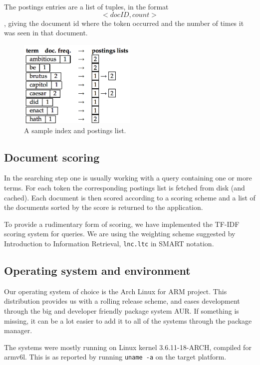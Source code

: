 The postings entries are a list of tuples, in the format $$<docID, count>$$, giving the document id where the token occurred and the number of times it was seen in that document.

\begin{figure}[h]
    \center
    \includegraphics[width=0.5\textwidth]{software/index_postings_lists}
    \caption{A sample index and postings list.\cite{IntroIR}}
    \label{fig:index_postings_lists_sw}
\end{figure}

\subsection{Document scoring}
In the searching step one is usually working with a query containing one or more terms. For each token the corresponding postings list is fetched from disk (and cached). Each document is then scored according to a scoring scheme and a list of the documents sorted by the score is returned to the application.

To provide a rudimentary form of scoring, we have implemented the TF-IDF scoring system for queries. We are using the weighting scheme suggested by Introduction to Information Retrieval\cite{IntroIR}, {\tt lnc.ltc} in SMART notation\cite{tfidfsmart}.


\subsection{Operating system and environment}
Our operating system of choice is the Arch Linux for ARM project\cite{archarm}. This distribution provides us with a rolling release scheme, and eases development through the big and developer friendly package system AUR. If something is missing, it can be a lot easier to add it to all of the systems through the package manager.

The systems were mostly running on Linux kernel 3.6.11-18-ARCH, compiled for armv6l. This is as reported by running {\tt uname -a} on the target platform.

